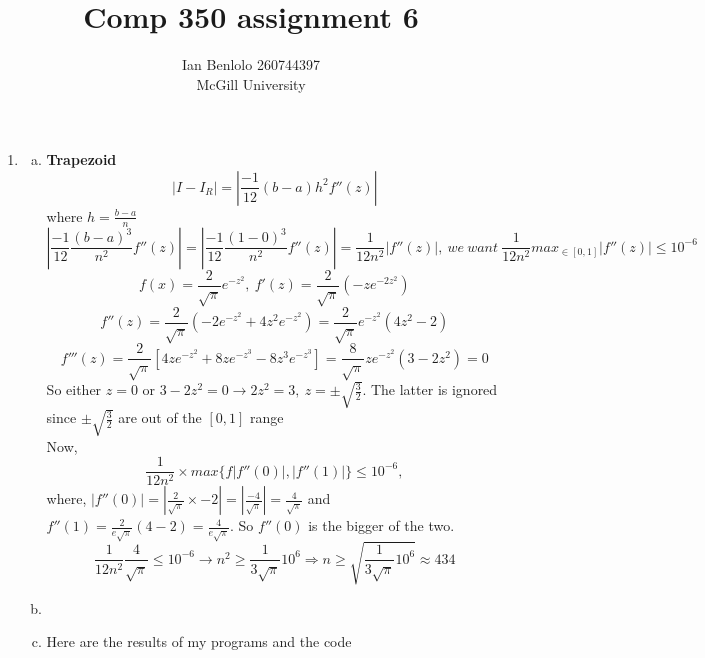 
\usepackage{cancel}
\usepackage{verbatim}
\usepackage{graphicx}
\newcommand{\Le}{\left}
\newcommand{\Ri}{\right}
\usepackage{enumerate}
\usepackage{appendix}
\title{Comp 350 assignment 6}
\author{Ian Benlolo 260744397\\McGill University \\}

\maketitle
\begin{enumerate}[1.]
\item
	\begin{enumerate}[(a)]
	\item
\textbf{Trapezoid}
$$\left|I-I_R\right|= \left|\frac{-1}{12}(b-a)h^2f''(z)\Ri| $$ where $h=\frac{b-a}{n}$\\
$$\Le| \frac{-1}{12}\frac{(b-a)^3}{n^2}f''(z)\Ri|=\Le|\frac{-1}{12}\frac{(1-0)^3}{n^2}f''(z) \Ri| = \frac{1}{12n^2}\Le|f''(z)\Ri|,\ we\ want\  \frac{1}{12n^2}max_{\in [0,1]} \Le| f''(z)\Ri| \leq 10^{-6}$$
$$f(x)=\frac{2}{\sqrt{\pi}}e^{-z^2}, \ f'(z)=\frac{2}{\sqrt{\pi}}(-ze^{-2z^2})$$ $$f''(z)=\frac{2}{\sqrt{\pi}}(-2e^{-z^2}+4z^2e^{-z^2})=\frac{2}{\sqrt{\pi}}e^{-z^2}(4z^2-2)$$ $$f'''(z)=\frac{2}{\sqrt\pi}[4ze^{-z^2}+8ze^{-z^3}-8z^3e^{-z^3}]=\frac{8}{\sqrt\pi}ze^{-z^2}(3-2z^2)=0 $$ So either $z=0$ or $3-2z^2=0\rightarrow 2z^2=3,\ z=\pm\sqrt{\frac{3}{2}}$. The latter is ignored since $\pm\sqrt{\frac{3}{2}}$ are out of the $[0,1]$ range\\
Now,\\
$$\frac{1}{12n^2}\times max\{f\Le|f''(0)\Ri|, \Le|f''(1)\Ri| \} \leq 10^{-6},$$where, $\Le|f''(0)\Ri|=\Le| \frac{2}{\sqrt\pi}\times-2\Ri|=\Le|\frac{-4}{\sqrt\pi}\Ri| =\frac{4}{\sqrt\pi}$ and $f''(1)=\frac{2}{e\sqrt\pi}(4-2)=\frac{4}{e\sqrt\pi}$. So $f''(0)$ is the bigger of the two.\\
$$\frac{1}{12n^2}\frac{4}{\sqrt\pi}\leq10^{-6}\rightarrow n^2\geq \frac{1}{3\sqrt\pi}10^6\Rightarrow n\geq \sqrt{\frac{1}{3\sqrt\pi}10^6} \approx 434$$


	\item\item Here are the results of my programs and the code
		

\end{enumerate}
\end{enumerate}
